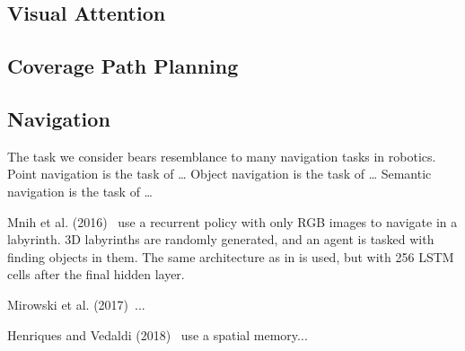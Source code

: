 

\subsection{Visual Attention}



\cite{minut_mahadevan_2001}

\subsection{Coverage Path Planning}

\cite{galceran_carreras_2013} %

\cite{krishna_tetromino_2020} %

\subsection{Navigation}

The task we consider bears resemblance to many navigation tasks in robotics.
Point navigation is the task of \dots
Object navigation is the task of \dots
Semantic navigation is the task of \dots

Mnih et al. (2016)~\cite{mnih_asynchronous_2016} use a recurrent policy with only RGB images to navigate in a labyrinth.
3D labyrinths are randomly generated, and an agent is tasked with finding objects in them.
The same architecture as in \cite{mnih_human_2015} is used, but with 256 LSTM cells after the final hidden layer.



Mirowski et al. (2017)~\cite{mirowski_navigate_2017}...

Henriques and Vedaldi (2018)~\cite{henriques_vedaldi_2018} use a spatial memory...

